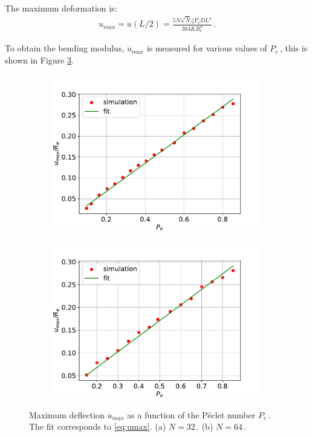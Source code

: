 \documentclass[bachelor,       %
               twoside,        %
               BCOR10mm,       %
               ngerman, english %
               ]{GAUBM}
\begin{document}
The maximum deformation is:
\begin{align}
    u_{max}=u(L/2)=\frac{5N\sqrt{\bar N}\zeta P_e DL^4}{384KR_e^4}\,.
    \label{eq:umax}
\end{align}

To obtain the bending modulus, $u_{max}$ is measured for various values of $P_e\,$, this is shown in Figure \ref{fig:stress_strain}.


\begin{figure}[h]
  \centering
  \begin{subfigure}[b]{0.45\textwidth}
      \centering
      \includegraphics[width=\textwidth]{figures/stress_strain_plot_N32.pdf}
      \caption{}
      \label{fig:stress_strain_N32}
  \end{subfigure}
    \hfill
  \begin{subfigure}[b]{0.45\textwidth}
      \centering
      \includegraphics[width=\textwidth]{figures/stress_strain_plot_N64.pdf}
      \caption{}
      \label{fig:stress_strain_N64}
  \end{subfigure}
     \caption{Maximum deflection  $u_{max}$ as a function of the P\'eclet number $P_e\,.$ The fit corresponds to \eqref{eq:umax}. (a) $N=32\,.$ (b) $N=64\,.$}
     \label{fig:stress_strain}
\end{figure}
\end{document}
